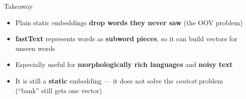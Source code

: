 \documentclass[aspectratio=169]{beamer}
\begin{document}
\begin{frame}{Takeaway}
\vspace{0.4cm}
\begin{itemize}\setlength\itemsep{10pt}
  \item[\textcolor{wurgreen}{\faCheck}]
    Plain static embeddings \textbf{drop words they never saw} (the OOV problem)
  \item[\textcolor{wurgreen}{\faCheck}]
    \textbf{fastText} represents words as \textbf{subword pieces}, so it can build vectors for
    unseen words
  \item[\textcolor{wurgreen}{\faCheck}]
    Especially useful for \textbf{morphologically rich languages} and \textbf{noisy text}
  \item[\textcolor{wurgreen}{\faCheck}]
    It is still a \textbf{static} embedding --- it does not solve the \emph{context} problem
    (``bank'' still gets one vector)
\end{itemize}

\medskip
{}
\end{frame}


\end{document}
